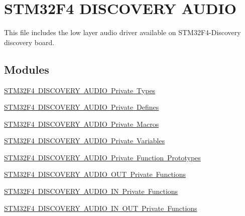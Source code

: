 \hypertarget{group___s_t_m32_f4___d_i_s_c_o_v_e_r_y___a_u_d_i_o}{}\section{S\+T\+M32\+F4 D\+I\+S\+C\+O\+V\+E\+RY A\+U\+D\+IO}
\label{group___s_t_m32_f4___d_i_s_c_o_v_e_r_y___a_u_d_i_o}


This file includes the low layer audio driver available on S\+T\+M32\+F4-\/\+Discovery discovery board.  


\subsection*{Modules}
\begin{DoxyCompactItemize}
\item 
\mbox{\hyperlink{group___s_t_m32_f4___d_i_s_c_o_v_e_r_y___a_u_d_i_o___private___types}{S\+T\+M32\+F4 D\+I\+S\+C\+O\+V\+E\+R\+Y A\+U\+D\+I\+O Private Types}}
\item 
\mbox{\hyperlink{group___s_t_m32_f4___d_i_s_c_o_v_e_r_y___a_u_d_i_o___private___defines}{S\+T\+M32\+F4 D\+I\+S\+C\+O\+V\+E\+R\+Y A\+U\+D\+I\+O Private Defines}}
\item 
\mbox{\hyperlink{group___s_t_m32_f4___d_i_s_c_o_v_e_r_y___a_u_d_i_o___private___macros}{S\+T\+M32\+F4 D\+I\+S\+C\+O\+V\+E\+R\+Y A\+U\+D\+I\+O Private Macros}}
\item 
\mbox{\hyperlink{group___s_t_m32_f4___d_i_s_c_o_v_e_r_y___a_u_d_i_o___private___variables}{S\+T\+M32\+F4 D\+I\+S\+C\+O\+V\+E\+R\+Y A\+U\+D\+I\+O Private Variables}}
\item 
\mbox{\hyperlink{group___s_t_m32_f4___d_i_s_c_o_v_e_r_y___a_u_d_i_o___private___function___prototypes}{S\+T\+M32\+F4 D\+I\+S\+C\+O\+V\+E\+R\+Y A\+U\+D\+I\+O Private Function Prototypes}}
\item 
\mbox{\hyperlink{group___s_t_m32_f4___d_i_s_c_o_v_e_r_y___a_u_d_i_o___o_u_t___private___functions}{S\+T\+M32\+F4 D\+I\+S\+C\+O\+V\+E\+R\+Y A\+U\+D\+I\+O O\+U\+T Private Functions}}
\item 
\mbox{\hyperlink{group___s_t_m32_f4___d_i_s_c_o_v_e_r_y___a_u_d_i_o___i_n___private___functions}{S\+T\+M32\+F4 D\+I\+S\+C\+O\+V\+E\+R\+Y A\+U\+D\+I\+O I\+N Private Functions}}
\item 
\mbox{\hyperlink{group___s_t_m32_f4___d_i_s_c_o_v_e_r_y___a_u_d_i_o___i_n___o_u_t___private___functions}{S\+T\+M32\+F4 D\+I\+S\+C\+O\+V\+E\+R\+Y A\+U\+D\+I\+O I\+N O\+U\+T Private Functions}}

\end{DoxyCompactItemize}
